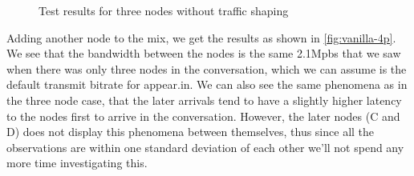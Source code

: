 \begin{figure}
\begin{subfigure}[t]{.48\textwidth}
    \end{subfigure}
    \caption{Test results for three nodes without traffic shaping}
    \label{fig:vanilla-3p}
\end{figure}

Adding another node to the mix, we get the results as shown in \autoref{fig:vanilla-4p}. We see that the bandwidth between the nodes is the same 2.1Mpbs that we saw when there was only three nodes in the conversation, which we can assume is the default transmit bitrate for appear.in. We can also see the same phenomena as in the three node case, that the later arrivals tend to have a slightly higher latency to the nodes first to arrive in the conversation. However, the later nodes (C and D) does not display this phenomena between themselves, thus since all the observations are within one standard deviation of each other we'll not spend any more time investigating this.


